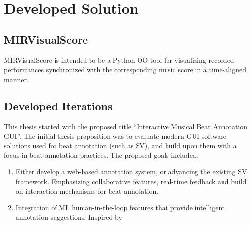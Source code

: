 \chapter{Developed Solution}\label{chap:chap3}





\section{MIRVisualScore}
MIRVisualScore is intended to be a Python OO tool for visualizing recorded performances synchronized with the corresponding music score in a time-aligned manner.

\section{Developed Iterations}
This thesis started with the proposed title ``Interactive Musical Beat Annotation GUI''. The initial thesis proposition was to evaluate modern GUI software solutions used for beat annotation (such as  SV), and build upon them with a focus in beat annotation practices.
The proposed goals included:
\begin{enumerate}
    \item Either develop a web-based annotation system, or advancing the existing SV framework. Emphasizing collaborative features, real-time feedback and build on interaction mechanisms for beat annotation. 
    \item Integration of ML human-in-the-loop features that provide intelligent annotation suggestions. Inspired by 
\end{enumerate}

